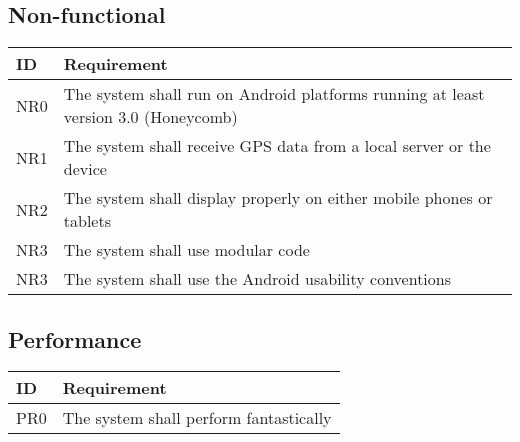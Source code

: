 \documentclass{article}
\begin{document}
\subsection{Non-functional}

\begin{tabular}{ | p{.5in} | p{5in} | }
\hline
\textbf{ID} & \textbf{Requirement}\\
\hline
\hline
NR0 & The system shall run on Android platforms running at least version 3.0 (Honeycomb)\\
\hline
NR1 & The system shall receive GPS data from a local server or the device\\
\hline
NR2 & The system shall display properly on either mobile phones or tablets\\
\hline
NR3 & The system shall use modular code\\
\hline
NR3 & The system shall use the Android usability conventions\\
\hline
\end{tabular}


\subsection{Performance}

\begin{tabular}{ | p{.5in} | p{5in} | }
\hline
\textbf{ID} & \textbf{Requirement}\\
\hline
\hline
PR0 & The system shall perform fantastically\\
\hline
\end{tabular}
\end{document}

